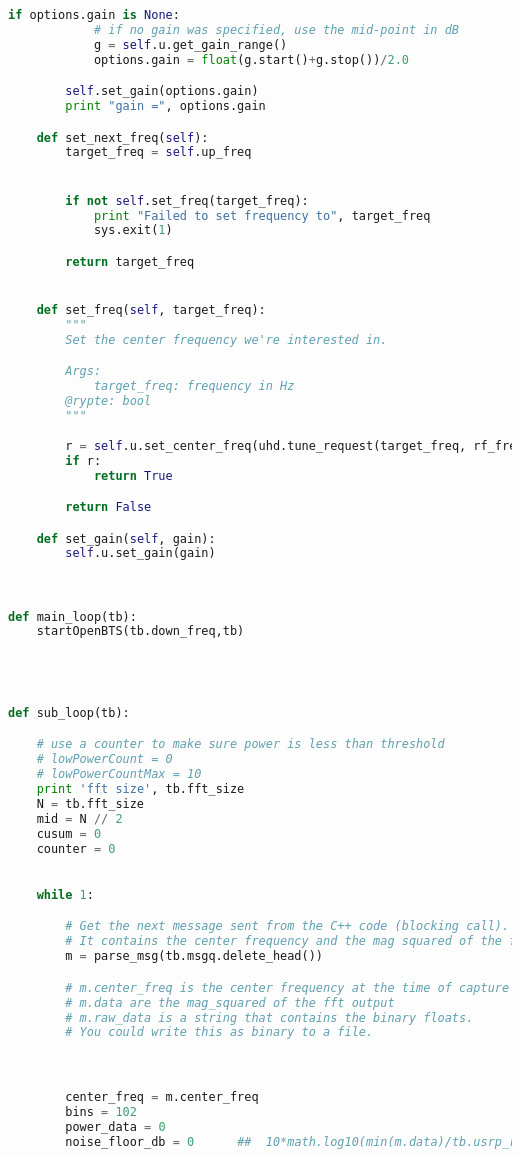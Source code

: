 \begin{lstlisting}[language=Python]
        if options.gain is None:
            # if no gain was specified, use the mid-point in dB
            g = self.u.get_gain_range()
            options.gain = float(g.start()+g.stop())/2.0

        self.set_gain(options.gain)
        print "gain =", options.gain

    def set_next_freq(self):
        target_freq = self.up_freq


        if not self.set_freq(target_freq):
            print "Failed to set frequency to", target_freq
            sys.exit(1)

        return target_freq


    def set_freq(self, target_freq):
        """
        Set the center frequency we're interested in.

        Args:
            target_freq: frequency in Hz
        @rypte: bool
        """
        
        r = self.u.set_center_freq(uhd.tune_request(target_freq, rf_freq=(target_freq + self.lo_offset),rf_freq_policy=uhd.tune_request.POLICY_MANUAL))
        if r:
            return True

        return False

    def set_gain(self, gain):
        self.u.set_gain(gain)
    


def main_loop(tb):
    startOpenBTS(tb.down_freq,tb)




def sub_loop(tb):

    # use a counter to make sure power is less than threshold
    # lowPowerCount = 0
    # lowPowerCountMax = 10
    print 'fft size', tb.fft_size
    N = tb.fft_size
    mid = N // 2
    cusum = 0
    counter = 0
    

    while 1:

        # Get the next message sent from the C++ code (blocking call).
        # It contains the center frequency and the mag squared of the fft
        m = parse_msg(tb.msgq.delete_head())

        # m.center_freq is the center frequency at the time of capture
        # m.data are the mag_squared of the fft output
        # m.raw_data is a string that contains the binary floats.
        # You could write this as binary to a file.



        center_freq = m.center_freq
        bins = 102
        power_data = 0
        noise_floor_db = 0      ##  10*math.log10(min(m.data)/tb.usrp_rate)
        

\end{lstlisting}
